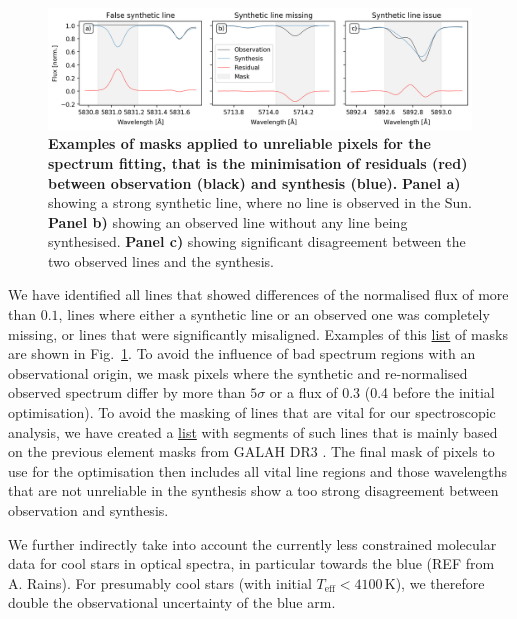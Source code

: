 \documentclass[
  journal=pasa,
  manuscript=research-paper, %
  year=2021,
  volume=37
]{cup-journal}
\begin{document}
\begin{figure}[hbt!]
 \centering  
 \includegraphics[width=\textwidth]{figures/example_masking_sun.png}
\caption{\textbf{Examples of masks applied to unreliable pixels for the spectrum fitting, that is the minimisation of residuals (red) between observation (black) and synthesis (blue).} \textbf{Panel a)} showing a strong synthetic line, where no line is observed in the Sun. \textbf{Panel b)} showing an observed line without any line being synthesised. \textbf{Panel c)} showing significant disagreement between the two observed lines and the synthesis.} \label{fig:example_masking_sun}
\end{figure}

We have identified all lines that showed differences of the normalised flux of more than $0.1$, lines where either a synthetic line or an observed one was completely missing, or lines that were significantly misaligned. Examples of this \href{https://github.com/svenbuder/GALAH_DR4/blob/main/spectrum_analysis/spectrum_masks/solar_spectrum_mask.fits}{list} of masks are shown in Fig.~\ref{fig:example_masking_sun}. To avoid the influence of bad spectrum regions with an observational origin, we mask pixels where the synthetic and re-normalised observed spectrum differ by more than $5\sigma$ or a flux of 0.3 (0.4 before the initial optimisation). To avoid the masking of lines that are vital for our spectroscopic analysis, we have created a \href{https://github.com/svenbuder/GALAH_DR4/blob/main/spectrum_analysis/spectrum_masks/vital_lines.fits}{list} with segments of such lines that is mainly based on the previous element masks from GALAH DR3 \citep{Buder2021}. The final mask of pixels to use for the optimisation then includes all vital line regions and those wavelengths that are not unreliable in the synthesis show a too strong disagreement between observation and synthesis.

We further indirectly take into account the currently less constrained molecular data for cool stars in optical spectra, in particular towards the blue (REF from A. Rains). For presumably cool stars (with initial $T_\text{eff} < 4100\,\mathrm{K}$), we therefore double the observational uncertainty of the blue arm.
\end{document}

